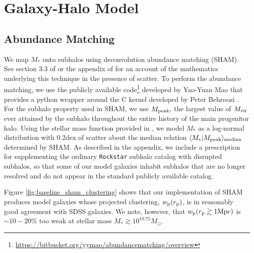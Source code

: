\documentclass[usenatbib,usegraphicx,letterpaper]{mn2e}
\newcommand{\mstar}{M_{\ast}}
\newcommand{\mvir}{M_{\rm vir}}
\newcommand{\mpeak}{M_{\rm peak}}
\newcommand{\rproj}{r_{\rm p}}
\newcommand{\wproj}{w_{\rm p}}
\newcommand{\median}[2]{\langle{#1}\vert{#2}\rangle_{\rm median}}
\newcommand{\msun}{M_\odot}
\begin{document}
\section{Galaxy-Halo Model}
\label{sec:model}

\subsection{Abundance Matching}
\label{subsec:sham}

We map $\mstar$ onto subhalos using deconvolution abundance matching (SHAM). See section 3.3 of \citet{behroozi_etal10} or the appendix of \citet{kravtsov_etal14} for an account of the mathematics underlying this technique in the presence of scatter. To perform the abundance matching, we use the publicly available code\footnote{\url{https://bitbucket.org/yymao/abundancematching/overview}} developed by Yao-Yuan Mao \citep{lehmann_etal15} that provides a python wrapper around the C kernel developed by Peter Behroozi \citep{behroozi_etal10}. For the subhalo property used in SHAM, we use $\mpeak,$ the largest value of $\mvir$ ever attained by the subhalo throughout the entire history of the main progenitor halo.  Using the stellar mass function provided in \citet{moustakas_etal13}, we model $\mstar$ as a log-normal distribution with $0.2$dex of scatter about the median relation $\median{\mstar}{\mpeak}$ determined by SHAM. As described in the appendix, we include a prescription for supplementing the ordinary {\tt Rockstar} subhalo catalog with disrupted subhalos, so that some of our model galaxies inhabit subhalos that are no longer resolved and do not appear in the standard publicly available catalog.

Figure \ref{fig:baseline_sham_clustering} shows that our implementation of SHAM produces model galaxies whose projected clustering, $\wproj(\rproj)$, is in reasonably good agreement with SDSS galaxies. We note, however, that $\wproj(\rproj\gtrsim1{\rm Mpc})$ is $\sim10-20\%$ too weak at stellar mass $\mstar\gtrsim10^{10.75}\msun.$ 
\end{document}
